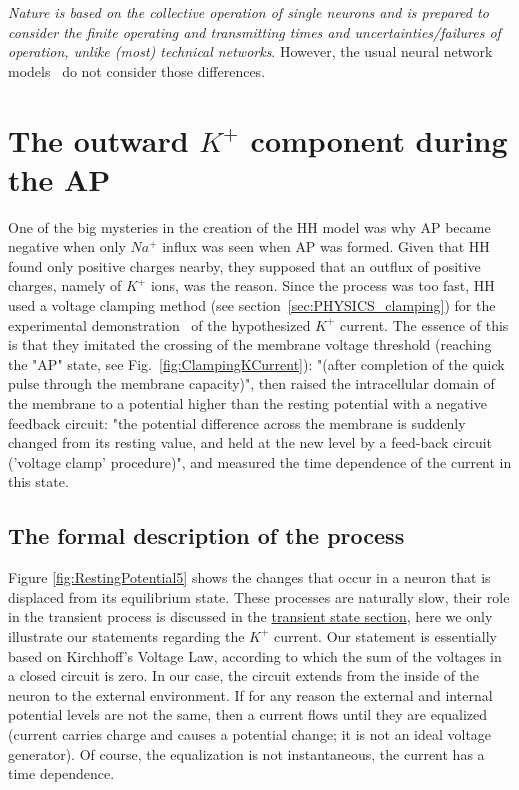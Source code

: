\textit{Nature is based on the collective operation of single neurons
and is prepared to consider the finite operating and transmitting times and uncertainties/failures of operation, unlike (most) technical networks}.
However, the usual neural network models~\cite{BrainNetworkModels:2018}
do not consider those differences.



\section[The outward $K^+$ component during the \gls{AP}]
{The outward $K^+$ component during the \gls{AP}\label{sec:Fallacies-OutwardK}}

One of the big mysteries in the creation of the \gls{HH}  model was why \gls{AP}
became negative when only
$Na^+$ influx was seen when \gls{AP} was formed. 
Given that \gls{HH} found only positive charges nearby, they supposed that
an outflux of positive charges, namely of $K^+$ ions,  was the reason.
Since the process was too fast, \gls{HH} used a voltage clamping method (see section~\ref{sec:PHYSICS_clamping}) for the experimental demonstration~\cite{HodgkinHuxleyCurrent:1952} of the hypothesized  $K^+$ current. The essence of this is that they
imitated the crossing of the membrane voltage threshold (reaching the "AP" state, see Fig.~\ref{fig:ClampingKCurrent}):
"(after completion of the quick pulse through the membrane
capacity)", then raised the intracellular domain of the membrane to a potential higher than the resting potential with a negative feedback circuit:
"the potential
difference across the membrane is suddenly changed from its resting
value, and held at the new level by a feed-back circuit ('voltage clamp' procedure)", and measured the time dependence of the current in this state.

\subsection[The formal description of the process]
{The formal description of the process\label{sec:Fallacies-OutwardKPhysicsFormal}}

Figure \ref{fig:RestingPotential5} shows the changes that occur in a neuron that is displaced from its equilibrium state.
These processes are naturally slow, their role in the
transient process is discussed in the \hyperlink{TransientState}{transient state section},
here we only illustrate our statements regarding the $K^+$ current.
Our statement is essentially based on Kirchhoff's Voltage Law,
according to which the sum of the voltages in a closed circuit is zero.
 In our case, the circuit extends from the inside of the neuron to the external environment.
If for any reason the external and internal potential levels are not the same, then a current flows until they are equalized (current carries charge and causes a potential change; it is not an ideal voltage generator).
Of course, the equalization is not
instantaneous, the current has a time dependence.

